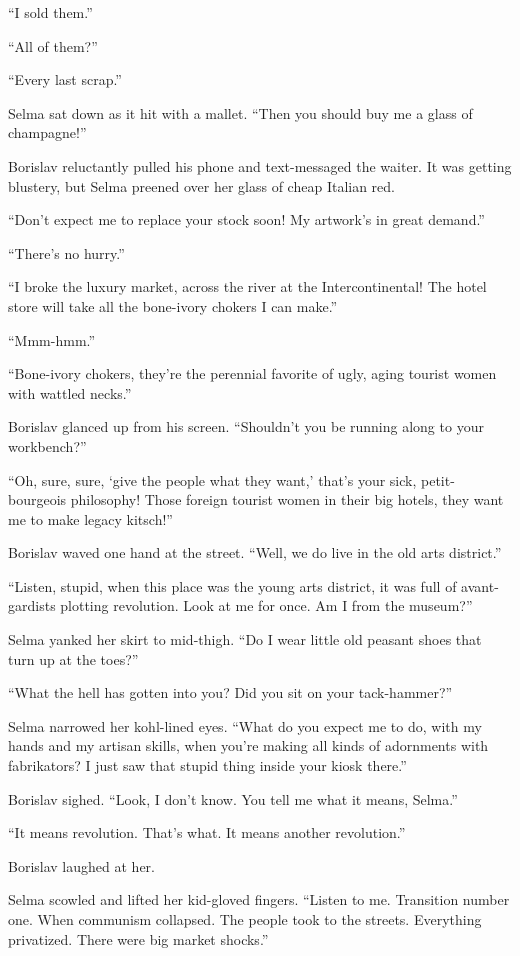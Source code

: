 \documentclass[20 pt,twoside,extrafontsizes,final]{memoir}
\begin{document}
``I sold them.''

``All of them?''

``Every last scrap.''

Selma sat down as it hit with a mallet. ``Then you should buy me a glass of champagne!''

Borislav reluctantly pulled his phone and text-messaged the waiter. It was getting blustery, but Selma preened over her glass of cheap Italian red.

``Don't expect me to replace your stock soon! My artwork's in great demand.''

``There's no hurry.''

``I broke the luxury market, across the river at the Intercontinental! The hotel store will take all the bone-ivory chokers I can make.''

``Mmm-hmm.''

``Bone-ivory chokers, they're the perennial favorite of ugly, aging tourist women with wattled necks.''

Borislav glanced up from his screen. ``Shouldn't you be running along to your workbench?''

``Oh, sure, sure, `give the people what they want,' that's your sick, petit-bourgeois philosophy! Those foreign tourist women in their big hotels, they want me to make legacy kitsch!''

Borislav waved one hand at the street. ``Well, we do live in the old arts district.''

``Listen, stupid, when this place was the young arts district, it was full of avant-gardists plotting revolution. Look at me for once. Am I from the museum?''

Selma yanked her skirt to mid-thigh. ``Do I wear little old peasant shoes that turn up at the toes?''

``What the hell has gotten into you? Did you sit on your tack-hammer?''

Selma narrowed her kohl-lined eyes. ``What do you expect me to do, with my hands and my artisan skills, when you're making all kinds of adornments with fabrikators? I just saw that stupid thing inside your kiosk there.''

Borislav sighed. ``Look, I don't know. You tell me what it means, Selma.''

``It means revolution. That's what. It means another revolution.''

Borislav laughed at her.

Selma scowled and lifted her kid-gloved fingers. ``Listen to me. Transition number one. When communism collapsed. The people took to the streets. Everything privatized. There were big market shocks.''
\end{document}
